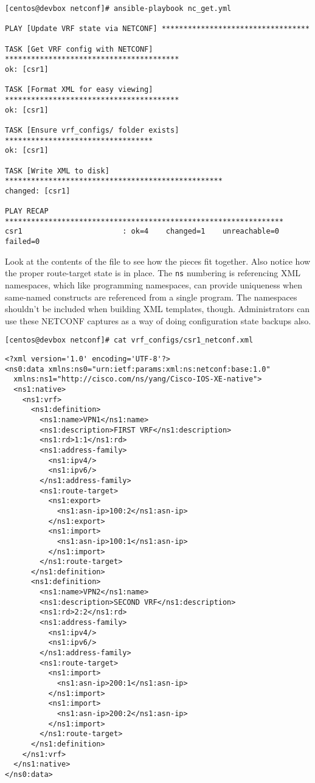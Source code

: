 \begin{verbatim}
[centos@devbox netconf]# ansible-playbook nc_get.yml

PLAY [Update VRF state via NETCONF] **********************************

TASK [Get VRF config with NETCONF] ****************************************
ok: [csr1]

TASK [Format XML for easy viewing] ****************************************
ok: [csr1]

TASK [Ensure vrf_configs/ folder exists] **********************************
ok: [csr1]

TASK [Write XML to disk] **************************************************
changed: [csr1]

PLAY RECAP ****************************************************************
csr1                       : ok=4    changed=1    unreachable=0    failed=0
\end{verbatim}

Look at the contents of the file to see how the pieces fit together. Also notice
how the proper route-target state is in place. The \verb|ns| numbering is
referencing XML namespaces, which like programming namespaces, can provide uniqueness
when same-named constructs are referenced from a single program. The namespaces
shouldn't be included when building XML templates, though. Administrators
can use these NETCONF captures as a way of doing configuration state
backups also.

\begin{verbatim}
[centos@devbox netconf]# cat vrf_configs/csr1_netconf.xml
\end{verbatim}

\begin{verbatim}
<?xml version='1.0' encoding='UTF-8'?>
<ns0:data xmlns:ns0="urn:ietf:params:xml:ns:netconf:base:1.0"
  xmlns:ns1="http://cisco.com/ns/yang/Cisco-IOS-XE-native">
  <ns1:native>
    <ns1:vrf>
      <ns1:definition>
        <ns1:name>VPN1</ns1:name>
        <ns1:description>FIRST VRF</ns1:description>
        <ns1:rd>1:1</ns1:rd>
        <ns1:address-family>
          <ns1:ipv4/>
          <ns1:ipv6/>
        </ns1:address-family>
        <ns1:route-target>
          <ns1:export>
            <ns1:asn-ip>100:2</ns1:asn-ip>
          </ns1:export>
          <ns1:import>
            <ns1:asn-ip>100:1</ns1:asn-ip>
          </ns1:import>
        </ns1:route-target>
      </ns1:definition>
      <ns1:definition>
        <ns1:name>VPN2</ns1:name>
        <ns1:description>SECOND VRF</ns1:description>
        <ns1:rd>2:2</ns1:rd>
        <ns1:address-family>
          <ns1:ipv4/>
          <ns1:ipv6/>
        </ns1:address-family>
        <ns1:route-target>
          <ns1:import>
            <ns1:asn-ip>200:1</ns1:asn-ip>
          </ns1:import>
          <ns1:import>
            <ns1:asn-ip>200:2</ns1:asn-ip>
          </ns1:import>
        </ns1:route-target>
      </ns1:definition>
    </ns1:vrf>
  </ns1:native>
</ns0:data>
\end{verbatim}

